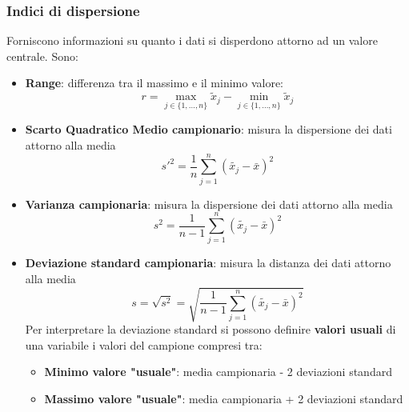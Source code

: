 \documentclass[a4paper]{article}
\theoremstyle{break}
\theoremstyle{break}
\theoremstyle{break}
\theoremstyle{break}
\begin{document}
\subsubsection{Indici di dispersione}
Forniscono informazioni su quanto i dati si disperdono attorno ad un valore centrale. Sono:
\begin{itemize}
  \item \textbf{Range}: differenza tra il massimo e il minimo valore:
    \[
      r = \underset{j \in \{1, \ldots, n\} }{\max} \tilde{x}_j - \underset{j \in \{1, \ldots, n\} }{\min} \tilde{x}_j
    \] 
	\item \textbf{Scarto Quadratico Medio campionario}: misura la dispersione dei dati attorno alla media
	      \[
		      s'^2 = \frac{1}{n} \sum_{j=1}^{n} (\tilde{x_j} - \bar{x})^2
	      \]
	\item \textbf{Varianza campionaria}: misura la dispersione dei dati attorno alla media
	      \[
		      s^2 = \frac{1}{n-1} \sum_{j=1}^{n} (\tilde{x_j} - \bar{x})^2
	      \]
	\item \textbf{Deviazione standard campionaria}: misura la distanza dei dati attorno alla media
	      \[
		      s = \sqrt{s^2} = \sqrt{\frac{1}{n-1} \sum_{j=1}^{n} (\tilde{x_j} - \bar{x})^2}
	      \]
        Per interpretare la deviazione standard si possono definire 
        \textbf{valori usuali} di una variabile i valori del campione compresi tra:
        \begin{itemize}
          \item \textbf{Minimo valore "usuale"}: media campionaria - 2 deviazioni standard
          \item \textbf{Massimo valore "usuale"}: media campionaria + 2 deviazioni standard
        \end{itemize}

\end{itemize}
\end{document}
